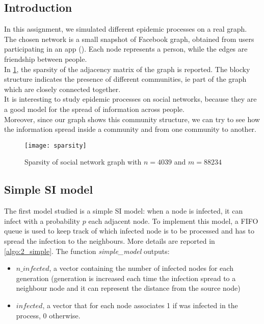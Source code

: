 \graphicspath{{../assignment2/figures/}}

\subsection{Introduction}

In this assignment, we simulated different epidemic processes on a real graph. The chosen network is a small snapshot of Facebook graph, obtained from users participating in an app (\cite{db_fb}). Each node represents a person, while the edges are friendship between people.\\
In \cref{fig:2_sparsity}, the sparsity of the adjacency matrix of the graph is reported. The blocky structure indicates the presence of different communities, ie part of the graph which are closely connected together.\\
It is interesting to study epidemic processes on social networks, because they are a good model for the spread of information across people.\\ Moreover, since our graph shows this community structure, we can try to see how the information spread inside a community and from one community to another.


\begin{figure} [!ht]
	\centering
	\texttt{[image: sparsity]}
	\caption{Sparsity of social network graph with  $n = 4039$ and $m = 88234$}
	\label{fig:2_sparsity}
\end{figure}


\subsection{Simple SI model}
The first model studied is a simple SI model: when a node is infected, it can infect with a probability $p$ each adjacent node. To implement this model, a FIFO queue is used to keep track of which infected node is to be processed and has to spread the infection to the neighbours. More details are reported in \cref{algo:2_simple}. The function  \textit{simple\_model} outputs:
\begin{itemize}
	\item $n\_infected$, a vector containing the number of infected nodes for each generation (generation is increased each time the infection spread to a neighbour node and it can represent the distance from the source node)
	\item $infected$, a vector that for each node associates 1 if was infected in the process, 0 otherwise. 
\end{itemize}

